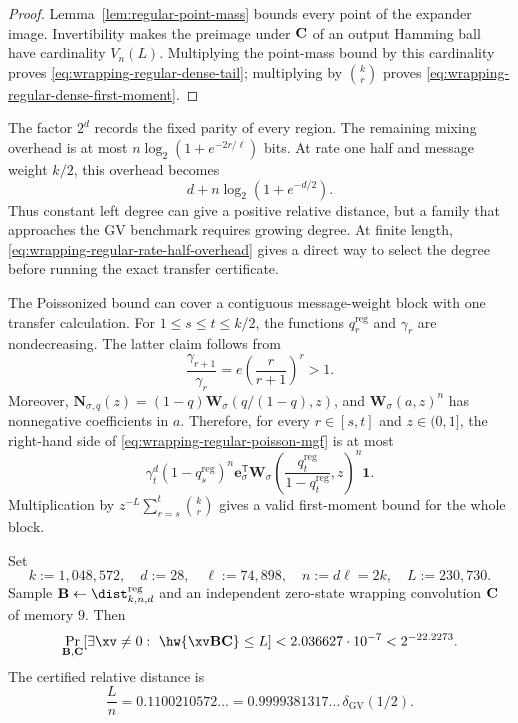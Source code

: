 \begin{proof}
Lemma~\ref{lem:regular-point-mass} bounds every point of the expander image.
Invertibility makes the preimage under $\mathbf C$ of an output Hamming ball have
cardinality $V_n(L)$.  Multiplying the point-mass bound by this cardinality proves
\eqref{eq:wrapping-regular-dense-tail}; multiplying by $\binom{k}{r}$ proves
\eqref{eq:wrapping-regular-dense-first-moment}.
\end{proof}

The factor $2^d$ records the fixed parity of every region.  The remaining
mixing overhead is at most
$n\log_2(1+e^{-2r/\ell})$ bits.  At rate one half and message weight $k/2$,
this overhead becomes
\begin{equation}
 d+n\log_2(1+e^{-d/2}).
 \label{eq:wrapping-regular-rate-half-overhead}
\end{equation}
Thus constant left degree can give a positive relative distance, but a family
that approaches the GV benchmark requires growing degree.  At finite length,
\eqref{eq:wrapping-regular-rate-half-overhead} gives a direct way to select the
degree before running the exact transfer certificate.

The Poissonized bound can cover a contiguous message-weight block with one
transfer calculation.  For $1\leq s\leq t\leq k/2$, the functions
$q^{\mathrm{reg}}_r$ and $\gamma_r$ are nondecreasing.  The latter claim
follows from
\[
 \frac{\gamma_{r+1}}{\gamma_r}
 =e\left(\frac{r}{r+1}\right)^r>1.
\]
Moreover,
$\mathbf N_{\sigma,q}(z)=(1-q)\mathbf W_\sigma(q/(1-q),z)$, and
$\mathbf W_\sigma(a,z)^n$ has nonnegative coefficients in $a$.  Therefore,
for every $r\in[s,t]$ and $z\in(0,1]$, the right-hand side of
\eqref{eq:wrapping-regular-poisson-mgf} is at most
\begin{equation}
 \gamma_t^d(1-q^{\mathrm{reg}}_s)^n
 \mathbf e_\sigma^\mathsf{T}
 \mathbf W_\sigma\!\left(
  \frac{q^{\mathrm{reg}}_t}{1-q^{\mathrm{reg}}_t},z
 \right)^n\mathbf 1.
 \label{eq:wrapping-regular-uniform-block}
\end{equation}
Multiplication by $z^{-L}\sum_{r=s}^t\binom{k}{r}$ gives a valid
first-moment bound for the whole block.

\begin{theorem}
\label{thm:wrapped-ec-certified-regular-rate-half}
Set
\[
 k:=1{,}048{,}572,
 \quad d:=28,
 \quad \ell:=74{,}898,
 \quad n:=d\ell=2k,
 \quad L:=230{,}730.
\]
Sample $\B\gets\dist^{\mathrm{reg}}_{k,n,d}$ and an independent zero-state
wrapping convolution $\mathbf C$ of memory $9$.  Then
\begin{equation}
 \Pr_{\B,\C}[\exists\xv\ne0:\ \hw{\xv\B\C}\leq L]
 <2.036627\mathbin{\cdot}10^{-7}<2^{-22.2273}.
 \label{eq:wrapped-ec-certified-regular-rate-half}
\end{equation}
The certified relative distance is
\[
 \frac{L}{n}=0.1100210572\ldots
 =0.9999381317\ldots\,\delta_{\mathrm{GV}}(1/2).
\]
\end{theorem}

